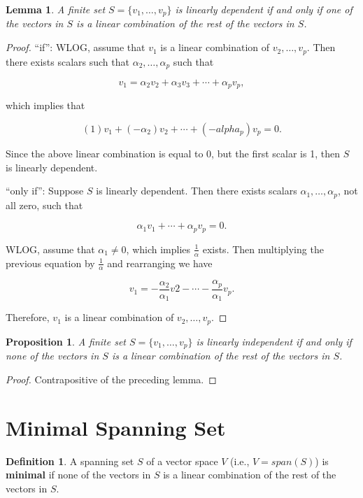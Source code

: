 \documentclass[12pt]{article}
\newtheorem*{proposition}{Proposition}
\newtheorem*{lemma}{Lemma}
\theoremstyle{definition}
\newtheorem*{definition}{Definition}
\begin{document}
\begin{lemma}
A finite set $S = \{ v_1, \ldots, v_p \}$ is linearly dependent if and only if one 
of the vectors in $S$ is a linear combination of the rest of the vectors in $S$.
\end{lemma}

\begin{proof}
``if'': WLOG, assume that $v_1$ is a linear combination of $v_2, \ldots, v_p$. Then 
there exists scalars such that $\alpha_2, \ldots, \alpha_p$ such that

\[ v_1 = \alpha_2 v_2 + \alpha_3 v_3 + \cdots + \alpha_p v_p, \] 

which implies that

\[ (1)v_1 + (-\alpha_2)v_2 + \cdots + (-alpha_p)v_p = 0. \]

Since the above linear combination is equal to 0, but the first scalar is 1, then
$S$ is linearly dependent.

``only if'': Suppose $S$ is linearly dependent. Then there exists scalars
$\alpha_1, \ldots, \alpha_p$, not all zero, such that

\[ \alpha_1 v_1 + \cdots + \alpha_p v_p = 0. \] 

WLOG, assume that $\alpha_1 \neq 0$, which implies $\displaystyle \frac{1}{\alpha}$
exists. Then multiplying the previous equation by $\displaystyle \frac{1}{\alpha}$
and rearranging we have

\[ v_1 = -\frac{\alpha_2}{\alpha_1} v2 - \cdots - \frac{\alpha_p}{\alpha_1}v_p. \]

Therefore, $v_1$ is a linear combination of $v_2, \ldots, v_p$.
\end{proof}


\begin{proposition}
A finite set $S = \{v_1, \ldots, v_p \}$ is linearly independent if and only if none
of the vectors in $S$ is a linear combination of the rest of the vectors in $S$.
\end{proposition}

\begin{proof}
Contrapositive of the preceding lemma.
\end{proof}

\section{Minimal Spanning Set}

\begin{definition}
A spanning set $S$ of a vector space $V$ (i.e., $V = span(S)$) is \textbf{minimal} if
none of the vectors in $S$ is a linear combination of the rest of the vectors in $S$.
\end{definition}
\end{document}
